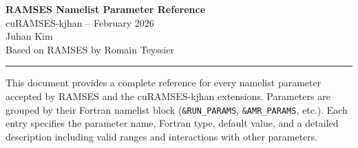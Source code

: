 \newcommand{\apinote}[1]{%
  \par\vspace{0.3em}%
  \noindent\textcolor{sectioncolor}{\textsf{\textbf{Note:}}} #1%
  \par\vspace{0.2em}%
}

\newcommand{\apiwarning}[1]{%
  \par\vspace{0.3em}%
  \noindent\textcolor{apinote}{\textsf{\textbf{Warning:}}} #1%
  \par\vspace{0.2em}%
}

\makeatletter
\newcommand{\paramref}[1]{%
  \begingroup
  \def\tmp{#1}%
  \hyperref[param:\tmp]{\texttt{\detokenize{#1}}}%
  \endgroup
}
\makeatother



\begin{center}
{\fontsize{28}{34}\selectfont\sffamily\bfseries
  \textcolor{sectioncolor}{RAMSES Namelist Parameter Reference}}\\[0.8cm]
{\large\sffamily cuRAMSES-kjhan -- February 2026}\\[0.3cm]
{\normalsize\sffamily Juhan Kim}\\[0.2cm]
{\small\sffamily\textcolor{apitype}{%
  Based on RAMSES by Romain Teyssier}}
\end{center}

\vspace{0.5cm}
\noindent\textcolor{sectioncolor!40}{\rule{\linewidth}{1pt}}

\vspace{0.6cm}
\noindent
This document provides a complete reference for every namelist parameter
accepted by RAMSES and the cuRAMSES-kjhan extensions.  Parameters are
grouped by their Fortran namelist block (\texttt{\&RUN\_PARAMS},
\texttt{\&AMR\_PARAMS}, etc.).  Each entry specifies the parameter name,
Fortran type, default value, and a detailed description including valid
ranges and interactions with other parameters.

